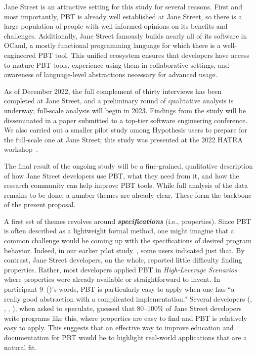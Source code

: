 Jane Street is
an attractive setting for this study for several reasons.  First and most
importantly, PBT is
already well established at Jane Street, so there is a large
population of people with well-informed opinions on its benefits and
challenges. Additionally, Jane Street famously builds nearly all of its
software in OCaml, a mostly functional programming language for which
there is a well-engineered PBT tool. This unified
ecosystem ensures that developers have access to mature PBT tools,
experience using them in collaborative settings,
and awareness of language-level abstractions necessary
for advanced usage.

As of December 2022, the full complement of thirty interviews has been
completed at Jane Street, and a preliminary round of qualitative
analysis is underway; full-scale analysis will begin in 2023.
Findings from the study will be disseminated in a paper submitted to a
top-tier software engineering conference.  We also carried out a
smaller pilot study among Hypothesis users to prepare for the
full-scale one at Jane Street; this study was presented at the
2022 HATRA workshop~\cite{goldstein_problems_2022}.

 The final result of
the ongoing study will be a fine-grained, qualitative description of how
Jane Street developers use PBT, what they need from it, and how the
research community can
help improve PBT tools. While full analysis of the data remains
to be done, a number themes are already clear. These form the backbone
of the present proposal.

\newcommand{\proptheme}[1]{{\color{nord-orange} \em #1}}
\newcommand{\gentheme}[1]{{\color{nord-green} \em #1}}
\newcommand{\evaltheme}[1]{{\color{nord-purple} \em #1}}
\newcommand{\edutheme}[1]{{\color{nord-frost4} \em #1}}
A first set of
themes revolves around \proptheme{\normalfont \bf specifications} (i.e.,
properties).
Since
PBT is often described as a lightweight formal method, one
might imagine that a common challenge would be coming up with the
specifications of desired program behavior. Indeed, in our earlier pilot
study~\cite{goldstein_problems_2022}, some users indicated just that.
By contrast, Jane Street developers, on the whole, reported
little difficulty finding
properties. Rather, most developers applied PBT in
\proptheme{High-Leverage Scenarios} where properties were already
available or straightforward to invent. In participant
9~()'s words, PBT is particularly easy to apply when one
has ``a really good abstraction with a complicated implementation.''
Several developers (, ,
, ), when asked to speculate, guessed
that 80--100\% of Jane Street
developers write programs like this, where properties are easy to find and
PBT is relatively easy to apply. This suggests that an effective way to
improve education and documentation for PBT would be to highlight
real-world applications that are a natural fit.

